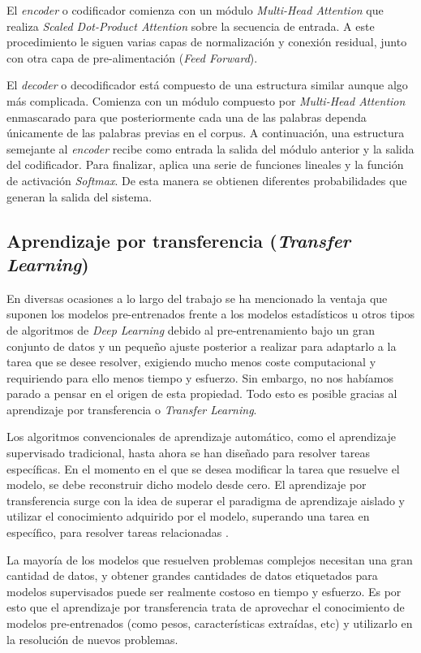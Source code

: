 El \textit{encoder} o codificador comienza con un módulo \textit{Multi-Head Attention} que realiza \textit{Scaled Dot-Product Attention} sobre la secuencia de entrada. A este procedimiento le siguen varias capas de normalización y conexión residual, junto con otra capa de pre-alimentación (\textit{Feed Forward}). 

El \textit{decoder} o decodificador está compuesto de una estructura similar aunque algo más complicada. Comienza con un módulo compuesto por \textit{Multi-Head Attention} enmascarado para que posteriormente cada una de las palabras dependa únicamente de las palabras previas en el corpus. A continuación, una estructura semejante al \textit{encoder} recibe como entrada la salida del módulo anterior y la salida del codificador. Para finalizar, aplica una serie de funciones lineales y la función de activación \textit{Softmax}. De esta manera se obtienen diferentes probabilidades que generan la salida del sistema.


\subsection{Aprendizaje por transferencia (\textit{Transfer Learning})}

En diversas ocasiones a lo largo del trabajo se ha mencionado la ventaja que suponen los modelos pre-entrenados frente a los modelos estadísticos u otros tipos de algoritmos de \textit{Deep Learning} debido al pre-entrenamiento bajo un gran conjunto de datos y un pequeño ajuste posterior a realizar para adaptarlo a la tarea que se desee resolver, exigiendo mucho menos coste computacional y requiriendo para ello menos tiempo y esfuerzo. Sin embargo, no nos habíamos parado a pensar en el origen de esta propiedad. Todo esto es posible gracias al aprendizaje por transferencia o \textit{Transfer Learning}.


Los algoritmos convencionales de aprendizaje automático, como el aprendizaje supervisado tradicional, hasta ahora se han diseñado para resolver tareas específicas. En el momento en el que se desea modificar la tarea que resuelve el modelo, se debe reconstruir dicho modelo desde cero. El aprendizaje por transferencia surge con la idea de superar el paradigma de aprendizaje aislado y utilizar el conocimiento adquirido por el modelo, superando una tarea en específico, para resolver tareas relacionadas \citep{pan2009survey}. 

La mayoría de los modelos que resuelven problemas complejos necesitan una gran cantidad de datos, y obtener grandes cantidades de datos etiquetados para modelos supervisados puede ser realmente costoso en tiempo y esfuerzo. Es por esto que el aprendizaje por transferencia trata de aprovechar el conocimiento de modelos pre-entrenados (como pesos, características extraídas, etc) y utilizarlo en la resolución de nuevos problemas. 

